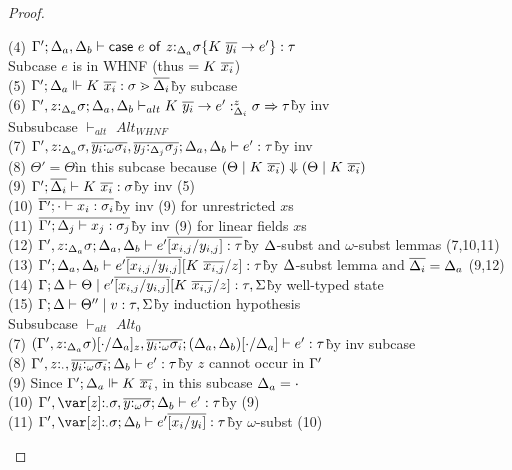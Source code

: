\documentclass[acmsmall,review,screen]{acmart}
\newcommand{\ccase}[2]{\mathsf{case}~#1~\mathsf{of}~#2}
\begin{document}
\begin{proof}
\begin{description}
\begin{tabbing}
    (4) $\G'; \D_a, \D_b \vdash \ccase{e}{z{:}_{\D_a}\s\{K~\ov{y_i}\to e'\}} : \tau$\\
    Subcase $e$ is in WHNF (thus $= K~\overline{x_i}$)\\
    (5) $\Gamma'; \Delta_a \Vdash K~\overline{x_i} : \sigma \gtrdot \overline{\Delta_i}$\` by subcase\\
    (6) $\Gamma', z{:}_{\Delta_a}\sigma; \Delta_a, \Delta_b \vdash_{alt} K~\overline{y_i} \to e' :^z_{\Delta_i} \sigma \Rightarrow \tau$\` by inv\\
    Subsubcase $\vdash_{alt}$ $Alt_{WHNF}$\\
    (7) $\Gamma', z{:}_{\Delta_a}\sigma, \overline{y_i{:}_\omega\sigma_i}, \overline{y_j{:}_{\Delta_j}\sigma_j}; \Delta_a, \Delta_b \vdash e' : \tau$\` by inv\\
    (8) $\Theta' = \Theta$\` in this subcase because $(\Theta \mid K~\overline{x_i})\Downarrow(\Theta \mid K~\overline{x_i})$\\
    (9) $\Gamma'; \overline{\Delta_i} \vdash K~\overline{x_i} : \sigma$\` by inv (5)\\
    (10) $\overline{\Gamma'; \cdot \vdash x_i : \sigma_i}$\` by inv (9) for unrestricted $x$s\\
    (11) $\overline{\Gamma'; \Delta_j \vdash x_j : \sigma_j}$\` by inv (9) for linear fields $x$s\\
    (12) $\Gamma', z{:}_{\Delta_a}\sigma; \Delta_a, \Delta_b \vdash e'\overline{[x_{i,j}/y_{i,j}] : \tau}$\` by $\Delta$-subst and $\omega$-subst lemmas (7,10,11)\\
    (13) $\Gamma'; \Delta_a, \Delta_b \vdash e'\overline{[x_{i,j}/y_{i,j}]}[K~\overline{x_{i,j}}/z] : \tau$\` by $\Delta$-subst lemma and $\overline{\Delta_i} = \Delta_a$ (9,12)\\
    (14) $\Gamma; \Delta \vdash \Theta \mid e'\overline{[x_{i,j}/y_{i,j}]}[K~\overline{x_{i,j}}/z] : \tau, \Sigma$\` by well-typed state\\
    (15) $\Gamma; \Delta \vdash \Theta'' \mid v : \tau, \Sigma$\` by induction hypothesis\\
    Subsubcase $\vdash_{alt}$ $Alt_{0}$\\
    (7) $(\Gamma', z{:}_{\Delta_a}\sigma)[\cdot/\Delta_a]_z, \overline{y_i{:}_\omega\sigma_i}; (\Delta_a, \Delta_b)[\cdot / \Delta_a] \vdash e' : \tau$\` by inv subcase\\
    (8) $\Gamma', z{:}_{\cdot}, \overline{y_i{:}_\omega\sigma_i}; \Delta_b \vdash e' : \tau$\` by $z$ cannot occur in $\Gamma'$\\
    (9) Since $\Gamma';\Delta_a \Vdash K~\overline{x_i}$, in this subcase $\Delta_a = \cdot$\\
    (10) $\G', \z{:}_\cdot\sigma, \ov{y{:}_\omega\sigma}; \D_b \vdash e' : \tau$\` by (9)\\
    (11) $\G', \z{:}_\cdot\sigma; \D_b \vdash e'\ov{[x_i/y_i]} : \tau$\` by $\omega$-subst (10)\\

\end{tabbing}
\end{description}
\end{proof}
\end{document}
